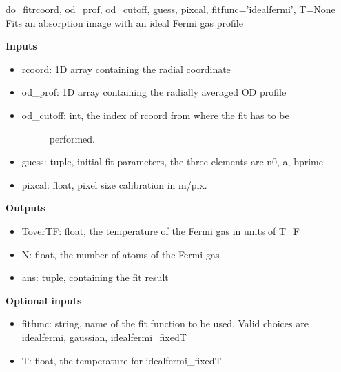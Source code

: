 \documentclass[letterpaper,10pt,english]{manual}
\begin{document}
\hypertarget{odysseus.fitfermions.do_fit}{}\begin{funcdesc}{do\_fit}{rcoord, od\_prof, od\_cutoff, guess, pixcal, fitfunc='idealfermi', T=None}
Fits an absorption image with an ideal Fermi gas profile

\textbf{Inputs}
\begin{itemize}
\item {} 
rcoord: 1D array containing the radial coordinate

\item {} 
od\_prof: 1D array containing the radially averaged OD profile

\item {} \begin{description}
\item[od\_cutoff: int, the index of rcoord from where the fit has to be] \leavevmode
performed.

\end{description}

\item {} 
guess: tuple, initial fit parameters, the three elements are n0, a,
bprime

\item {} 
pixcal: float, pixel size calibration in m/pix.

\end{itemize}

\textbf{Outputs}
\begin{itemize}
\item {} 
ToverTF: float, the temperature of the Fermi gas in units of T\_F

\item {} 
N: float, the number of atoms of the Fermi gas

\item {} 
ans: tuple, containing the fit result

\end{itemize}

\textbf{Optional inputs}
\begin{itemize}
\item {} 
fitfunc: string, name of the fit function to be used. Valid choices are
idealfermi, gaussian, idealfermi\_fixedT

\item {} 
T: float, the temperature for idealfermi\_fixedT

\end{itemize}
\end{funcdesc}
\end{document}
